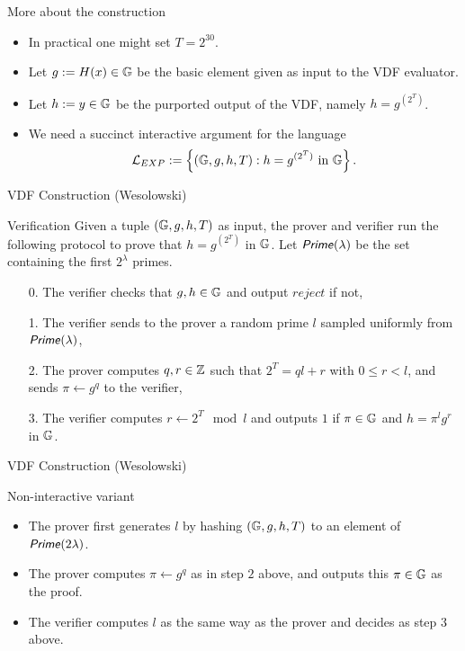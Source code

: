 \documentclass[UTF8]{beamer}
\begin{document}
	\begin{frame}{More about the construction}
		\begin{block}{}
			\begin{itemize}
				\item In practical one might set $T=2^{30}$.
				\item Let $g:=H(x)\in\mathbb{G}$ be the basic element given as input to the VDF evaluator.
				\item Let $h:=y\in\mathbb{G}$ be the purported output of the VDF, namely $h=g^{(2^T)}$.
				\item We need a succinct interactive argument for the language
				\begin{equation*}
					\mathcal{L}_{EXP}:=\left\{
					(\mathbb{G},g,h,T):h=g^{(2^T)}~\text{in}~\mathbb{G}
					\right\}.
				\end{equation*}
			\end{itemize}
		\end{block}
	\end{frame}

	\begin{frame}{VDF Construction (Wesolowski)}
		\begin{block}{Verification}
			Given a tuple $(\mathbb{G},g,h,T)$ as input, the prover and verifier run the following protocol to prove that $h=g^{(2^T)}$ in $\mathbb{G}$. Let $\textsf{\textit{Prime}}(\lambda)$ be the set containing the first $2^\lambda$ primes.
			\begin{enumerate}
				\item [0.] The verifier checks that $g,h\in\mathbb{G}$ and output $reject$ if not,
				\item [1.] The verifier sends to the prover a random prime $l$ sampled uniformly from $\textsf{\textit{Prime}}(\lambda)$,
				\item [2.] The prover computes $q,r\in\mathbb{Z}$ such that $2^T=ql+r$ with $0\leq r<l$, and sends $\pi\gets g^q$ to the verifier,
				\item [3.] The verifier computes $r\gets 2^T\mod l$ and outputs $1$ if $\pi\in\mathbb{G}$ and $h=\pi^lg^r$ in $\mathbb{G}$.
			\end{enumerate}
		\end{block}
	\end{frame}

	\begin{frame}{VDF Construction (Wesolowski)}
		\begin{block}{Non-interactive variant}
			\begin{itemize}
				\item The prover first generates $l$ by hashing $(\mathbb{G},g,h,T)$ to an element of $\textsf{\textit{Prime}}(2\lambda)$.
				\item The prover computes $\pi\gets g^q$ as in step $2$ above, and outputs this $\pi\in\mathbb{G}$ as the proof.
				\item The verifier computes $l$ as the same way as the prover and decides as step $3$ above.
			\end{itemize}
		\end{block}
	\end{frame}
\end{document}
